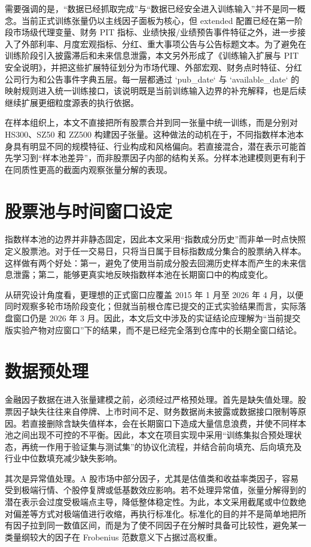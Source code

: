 需要强调的是，“数据已经抓取完成”与“数据已经安全进入训练输入”并不是同一概念。当前正式训练张量仍以主线因子面板为核心，但 extended 配置已经在第一阶段市场级代理变量、财务 PIT 指标、业绩快报/业绩预告事件特征之外，进一步接入了外部利率、月度宏观指标、分红、重大事项公告与公告标题文本。为了避免在训练阶段引入披露滞后和未来信息泄露，本文另外形成了《训练输入扩展与 PIT 安全说明》，并把这些扩展特征划分为市场代理、外部宏观、财务点时特征、分红公司行为和公告事件字典五层。每一层都通过 `pub_date` 与 `available_date` 的映射规则进入统一训练接口，该说明既是当前训练输入边界的补充解释，也是后续继续扩展更细粒度源表的执行依据。

在样本组织上，本文不直接把所有股票合并到同一张量中统一训练，而是分别对 HS300、SZ50 和 ZZ500 构建因子张量。这种做法的动机在于，不同指数样本池本身具有明显不同的规模特征、行业构成和风格偏向。若直接混合，潜在表示可能首先学习到“样本池差异”，而非股票因子内部的结构关系。分样本池建模则更有利于在同质性更高的截面内观察张量分解的表现。

\section{股票池与时间窗口设定}

指数样本池的边界并非静态固定，因此本文采用“指数成分历史”而非单一时点快照定义股票池。对于任一交易日，只将当日属于目标指数成分集合的股票纳入样本。这样做有两个好处：第一，避免了使用当前成分股去回溯历史样本而产生的未来信息泄露；第二，能够更真实地反映指数样本池在长期窗口中的构成变化。

从研究设计角度看，更理想的正式窗口应覆盖 2015 年 1 月至 2026 年 4 月，以便同时观察多轮市场阶段变化；但就当前根仓库已提交的正式实验结果而言，实际落盘窗口仍是 2026 年 3 月。因此，本文后文中涉及的实证结论应理解为“当前提交版实验产物对应窗口”下的结果，而不是已经完全落到仓库中的长期全窗口结论。

\section{数据预处理}

金融因子数据在进入张量建模之前，必须经过严格预处理。首先是缺失值处理。股票因子缺失往往来自停牌、上市时间不足、财务数据尚未披露或数据接口限制等原因。若直接删除含缺失值样本，会在长期窗口下造成大量信息浪费，并使不同样本池之间出现不可控的不平衡。因此，本文在项目实现中采用“训练集拟合预处理状态，再统一作用于验证集与测试集”的协议化流程，并结合前向填充、后向填充及行业中位数填充减少缺失影响。

其次是异常值处理。A 股市场中部分因子，尤其是估值类和收益率类因子，容易受到极端行情、个股停复牌或低基数效应影响。若不处理异常值，张量分解得到的潜在表示会过度受极端点主导，降低整体稳定性。为此，本文采用截尾或中位数绝对偏差等方式对极端值进行收缩，再执行标准化。标准化的目的并不是简单地把所有因子拉到同一数值区间，而是为了使不同因子在分解时具备可比较性，避免某一类量纲较大的因子在 Frobenius 范数意义下占据过高权重。

